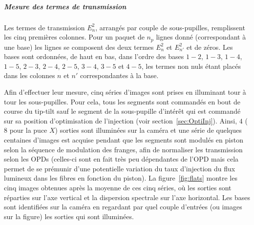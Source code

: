\begin{figure}[ht!]
    \label{fig:V2PMP2VMmesure}
\end{figure}


\subparagraph{Mesure des termes de transmission \\}

Les termes de transmission $E_{n}^2$, arrangés par couple de sous-pupilles,  remplissent les cinq premières colonnes. Pour un paquet de $n_p$ lignes donné (correspondant à une base) les lignes se composent des deux termes $E_{n}^2$ et $E_{n'}^2$ et de zéros. Les bases sont ordonnées, de haut en bas, dans l'ordre des bases $1-2$, $1-3$, $1-4$, $1-5$, $2-3$, $2-4$, $2-5$, $3-4$, $3-5$ et $4-5$, les termes non nuls étant placés dans les colonnes $n$ et $n'$ correspondantes à la base.

Afin d'effectuer leur mesure, cinq séries d'images sont prises en illuminant tour à tour les sous-pupilles. Pour cela, tous les segments sont commandés en bout de course du tip-tilt sauf le segment de la sous-pupille d'intérêt qui est commandé sur sa position d'optimisation de l'injection (voir section~\ref{sec:OptiInj}). Ainsi, $4$ ($8$ pour la puce $X$) sorties sont illuminées sur la caméra et une série de quelques centaines d'images est acquise pendant que les segments sont modulés en piston selon la séquence de modulation des franges, afin de normaliser les transmission selon les \ac{OPD}s (celles-ci sont en fait très peu dépendantes de l'\ac{OPD} mais cela permet de se prémunir d'une potentielle variation du taux d'injection du flux lumineux dans les fibres en fonction du piston). La figure~\ref{fig:flats} montre les cinq images obtenues après la moyenne de ces cinq séries, où les sorties sont réparties sur l'axe vertical et la dispersion spectrale sur l'axe horizontal. Les bases sont identifiées sur la caméra en regardant par quel couple d'entrées (ou images sur la figure) les sorties qui sont illuminées.


